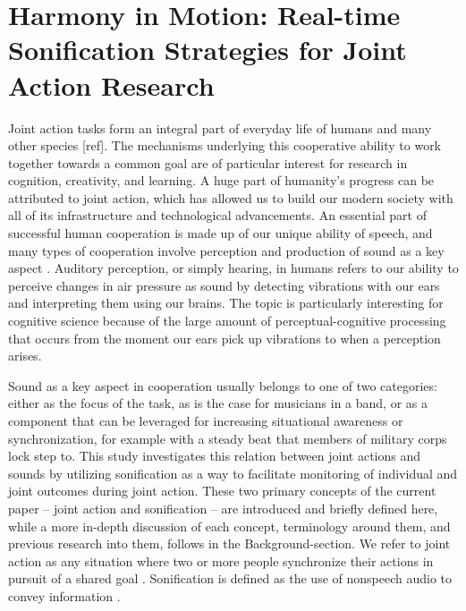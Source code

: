 \documentclass[10pt,a4paper,onecolumn]{article}
\begin{document}
\restoregeometry
\twocolumn
{
\hypersetup{linkcolor=Black}
\setcounter{tocdepth}{3}
\tableofcontents
}
\clearpage
\hypertarget{harmony-in-motion-real-time-sonification-strategies-for-joint-action-research}{%
\section{Harmony in Motion: Real-time Sonification Strategies for Joint Action Research}\label{harmony-in-motion-real-time-sonification-strategies-for-joint-action-research}}

Joint action tasks form an integral part of everyday life of humans \autocite{vanderwelUnderstandingJointAction2021} and many other species {[}ref{]}. The mechanisms underlying this cooperative ability to work together towards a common goal are of particular interest for research in cognition, creativity, and learning. A huge part of humanity's progress can be attributed to joint action, which has allowed us to build our modern society with all of its infrastructure and technological advancements. An essential part of successful human cooperation is made up of our unique ability of speech, and many types of cooperation involve perception and production of sound as a key aspect . Auditory perception, or simply hearing, in humans refers to our ability to perceive changes in air pressure as sound by detecting vibrations with our ears and interpreting them using our brains. The topic is particularly interesting for cognitive science because of the large amount of perceptual-cognitive processing that occurs from the moment our ears pick up vibrations to when a perception arises.

Sound as a key aspect in cooperation usually belongs to one of two categories: either as the focus of the task, as is the case for musicians in a band, or as a component that can be leveraged for increasing situational awareness or synchronization, for example with a steady beat that members of military corps lock step to. This study investigates this relation between joint actions and sounds by utilizing sonification as a way to facilitate monitoring of individual and joint outcomes during joint action. These two primary concepts of the current paper -- joint action and sonification -- are introduced and briefly defined here, while a more in-depth discussion of each concept, terminology around them, and previous research into them, follows in the Background-section. We refer to joint action as any situation where two or more people synchronize their actions in pursuit of a shared goal \autocite{knoblichPsychologicalResearchJoint2011}. Sonification is defined as the use of nonspeech audio to convey information \autocite[p.~4]{kramerSonificationReportStatus1999}.
\end{document}
